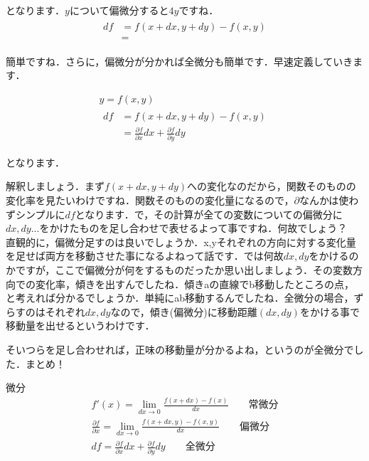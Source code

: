 \documentclass[11pt,a4paper]{jreport}
\begin{document}
となります．$y$について偏微分すると$4y$ですね．
\begin{eqnarray}
\begin{split}
df &= f(x+dx, y+dy) - f(x,y)\\
&= 
\end{split}
\end{eqnarray}

簡単ですね．さらに，偏微分が分かれば全微分も簡単です．早速定義していきます．

\begin{eqnarray}
\label{eq:all-partial}
y = f(x,y) \nonumber \\
\begin{split}
df &= f(x+dx, y+dy) - f(x,y)\\ 
&= \frac{\partial f}{\partial x}dx + \frac{\partial f}{\partial y}dy
\end{split}
\end{eqnarray}

となります．

解釈しましょう．まず$f(x+dx, y+dy)$への変化なのだから，関数そのものの変化率を見たいわけですね．関数そのものの変化量になるので，$\partial$なんかは使わずシンプルに$df$となります．で，その計算が全ての変数についての偏微分に$dx, dy...$をかけたものを足し合わせで表せるよって事ですね．何故でしょう？\\


直観的に，偏微分足すのは良いでしょうか．x,yそれぞれの方向に対する変化量を足せば両方を移動させた事になるよねって話です．では何故$dx, dy$をかけるのかですが，ここで偏微分が何をするものだったか思い出しましょう．その変数方向での変化率，傾きを出すんでしたね．傾きaの直線でb移動したところの点，と考えれば分かるでしょうか．単純にab移動するんでしたね．全微分の場合，ずらすのはそれぞれ$dx, dy$なので，傾き(偏微分)に移動距離$(dx,dy)$をかける事で移動量を出せるというわけです．

そいつらを足し合わせれば，正味の移動量が分かるよね，というのが全微分でした．まとめ！

\begin{screen}
微分
\begin{eqnarray}
f'(x) =\lim_{dx \rightarrow 0} \frac{f(x+dx) - f(x)}{dx}　\qquad \text{常微分}\nonumber \\
\frac{\partial f}{\partial x} = \lim_{dx \rightarrow 0} \frac{f(x+dx, y) - f(x, y)}{dx} \qquad \text{偏微分}\nonumber \\
df = \frac{\partial f}{\partial x}dx + \frac{\partial f}{\partial y}dy \qquad \text{全微分} \nonumber
\end{eqnarray}
\end{screen}
\end{document}
